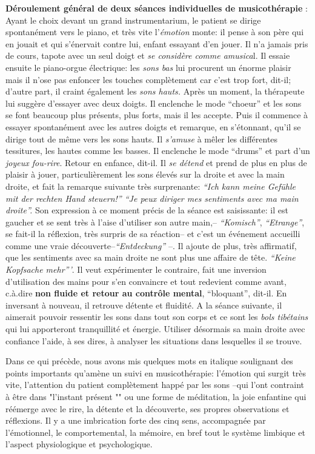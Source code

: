 \textbf{Déroulement général de deux séances individuelles de musicothérapie} :
Ayant le choix devant un grand instrumentarium,
le patient se dirige spontanément vers le piano, et très vite
l'\textit{émotion} monte: il pense à son père qui en jouait et qui
s'énervait contre lui, enfant essayant d'en
jouer. Il n'a jamais pris de cours, tapote avec un seul doigt et \textit{se considère comme
	amusica}l. Il essaie ensuite le piano-orgue  électrique: les \textit{sons bas}
lui procurent un énorme plaisir mais il n'ose pas enfoncer les touches
complètement car c'est trop fort, dit-il; d'autre part, il
craint également les
\textit{sons hauts.}
Après un moment, la thérapeute lui suggère d'essayer avec deux doigts.
Il enclenche le mode ``choeur'' et les sons se font beaucoup
plus présents, plus forts, mais il les accepte. Puis il commence à essayer spontanément
avec les autres doigts et remarque,  en s'étonnant, qu'il se
dirige tout de même vers les sons
hauts. Il \textit{s'amuse} à mêler les différentes tessitures,
les hautes comme les basses.
Il enclenche le mode ``drums'' et part d'un\textit{ joyeux
	fou-rire}. Retour en enfance, dit-il.
Il \textit{se détend} et prend de plus en plus de plaisir à jouer, particulièrement  les sons élevés
sur la droite et avec la main droite, et fait
la remarque suivante très surprenante:
\textit{``Ich kann meine Gefühle mit der rechten Hand steuern!''
	``Je peux diriger mes sentiments avec ma main droite''.}
Son expression à ce moment précis de la séance est saisissante: il
est gaucher et se sent très à l'aise d'utiliser son autre
main,-- \textit{``Komisch''},  \textit{``Etrange''}, se fait-il
la réflexion, très surpris de sa réaction-- et c'est un événement
accueilli comme une vraie
découverte--\textit{``Entdeckung''} --.
Il ajoute de plus, très affirmatif, que les sentiments avec sa main
droite ne sont plus une affaire de tête. \textit{``Keine
	Kopfsache mehr'''}. Il veut expérimenter le contraire, fait
une inversion d'utilisation des mains pour s'en convaincre et tout redevient comme
avant, c.à.dire \textbf{non fluide et retour au contrôle
	mental},
``bloquant'', dit-il. En inversant à nouveau, il retrouve
détente et fluidité.
A la séance suivante, il aimerait pouvoir ressentir
les sons dans tout son corps et ce sont les\textit{ bols
	tibétains } qui lui
apporteront tranquillité et
énergie. Utiliser désormais sa main
droite avec confiance l'aide, à ses dires, à analyser les
situations dans lesquelles il se trouve.


Dans ce qui précède, nous avons mis quelques mots en italique soulignant des  points
importants qu'amè\-ne un suivi en musicothérapie: l'émotion qui surgit très
vite,
l'attention du patient complètement happé par les sons --qui l'ont
contraint à être dans "l'instant présent "" ou une forme de méditation, la joie
enfantine qui réémerge avec le rire, la détente et la découverte,
ses propres observations et réflexions.
Il y a une imbrication forte des cinq sens, accompagnée par l'émotionnel, le comportemental, la
mémoire, en bref tout le système limbique et l'aspect
physiologique et psychologique.

